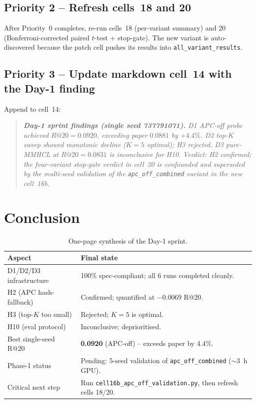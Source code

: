\documentclass[11pt,a4paper]{article}
\begin{document}
\subsection*{Priority 2 -- Refresh cells~18 and 20}

After Priority~0 completes, re-run cells~18 (per-variant summary) and 20
(Bonferroni-corrected paired $t$-test + stop-gate). The new variant is
auto-discovered because the patch cell pushes its results into
\texttt{all\_variant\_results}.

\subsection*{Priority 3 -- Update markdown cell~14 with the Day-1 finding}

Append to cell~14:

\begin{quote}\itshape
\small
\textbf{Day-1 sprint findings (single seed 737791071).}
D1 APC-off probe achieved \(R@20=0.0920\), exceeding paper \(0.0881\) by
\(+4.4\%\). D2 top-$K$ sweep showed monotonic decline ($K=5$ optimal); H3
rejected. D3 pure-MMHCL at \(R@20=0.0831\) is inconclusive for H10.
Verdict: H2 confirmed; the four-variant stop-gate verdict in cell~20 is
confounded and superseded by the multi-seed validation of the
\texttt{apc\_off\_combined} variant in the new cell~16b.
\end{quote}

\section{Conclusion}

\begin{table}[h]
\centering
\renewcommand{\arraystretch}{1.35}
\begin{tabularx}{\textwidth}{|l|X|}
\hline
\textbf{Aspect} & \textbf{Final state} \\
\hline
D1/D2/D3 infrastructure & 100\% spec-compliant; all 6 runs completed cleanly. \\
\hline
H2 (APC hash-fallback)  & \cellcolor{failred}Confirmed; quantified at $-0.0069$ R@20. \\
\hline
H3 (top-$K$ too small)  & \cellcolor{passgreen}Rejected; $K=5$ is optimal. \\
\hline
H10 (eval protocol)     & \cellcolor{warnyellow}Inconclusive; deprioritised. \\
\hline
Best single-seed R@20   & \textbf{0.0920} (APC-off) -- exceeds paper by 4.4\%. \\
\hline
Phase-1 status          & \cellcolor{warnyellow}Pending: 5-seed validation of
                          \texttt{apc\_off\_combined} (\(\sim\)3~h GPU). \\
\hline
Critical next step      & Run \texttt{cell16b\_apc\_off\_validation.py},
                          then refresh cells 18/20. \\
\hline
\end{tabularx}
\caption{One-page synthesis of the Day-1 sprint.}
\label{tab:conclusion}
\end{table}
\end{document}
